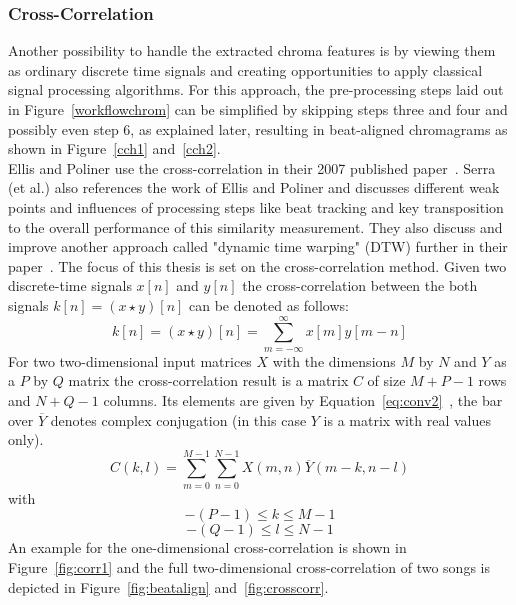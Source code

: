 \subsubsection{Cross-Correlation}\label{crosscorrsec}

Another possibility to handle the extracted chroma features is by viewing them as ordinary discrete time signals and creating opportunities to apply classical signal processing algorithms. For this approach, the pre-processing steps laid out in Figure~\ref{workflowchrom} can be simplified by skipping steps three and four and possibly even step 6, as explained later, resulting in beat-aligned chromagrams as shown in Figure~\ref{cch1} and~\ref{cch2}.\\
Ellis and Poliner use the cross-correlation in their 2007 published paper~\cite{chroma3}. Serra (et al.) also references the work of Ellis and Poliner and discusses different weak points and influences of processing steps like beat tracking and key transposition to the overall performance of this similarity measurement. 
They also discuss and improve another approach called "dynamic time warping" (DTW) further in their paper~\cite{chroma2}. The focus of this thesis is set on the cross-correlation method. 
Given two discrete-time signals $x[n]$ and $y[n]$ the cross-correlation between the both signals $k[n] = (x \star y)[n]$ can be denoted as follows:
\begin{equation} \label{eq:conv1}
k[n] = (x \star y)[n] = \sum_{m = -\infty}^{\infty}{x[m] y[m - n]} 
\end{equation}
For two two-dimensional input matrices $X$ with the dimensions $M$ by $N$ and $Y$ as a $P$ by $Q$ matrix the cross-correlation result is a matrix $C$ of size $M + P - 1$ rows and $N + Q - 1$ columns. Its elements are given by Equation~\eqref{eq:conv2}~\cite{mathcorr}, the bar over $\overline{Y}$ denotes complex conjugation (in this case $Y$ is a matrix with real values only). 
\begin{equation} \label{eq:conv2}
C(k, l) = \sum_{m = 0}^{M - 1}{\sum_{n = 0}^{N - 1}{X(m, n)\overline{Y}(m - k, n - l)}}
\end{equation}
with 
\begin{equation} \label{eq:conv3}
-(P - 1) \leq k \leq M - 1
\end{equation}
\begin{equation} \label{eq:conv4}
-(Q - 1) \leq l \leq N - 1
\end{equation}
An example for the one-dimensional cross-correlation is shown in Figure~\ref{fig:corr1} and the full two-dimensional cross-correlation of two songs is depicted in Figure~\ref{fig:beatalign} and~\ref{fig:crosscorr}.
